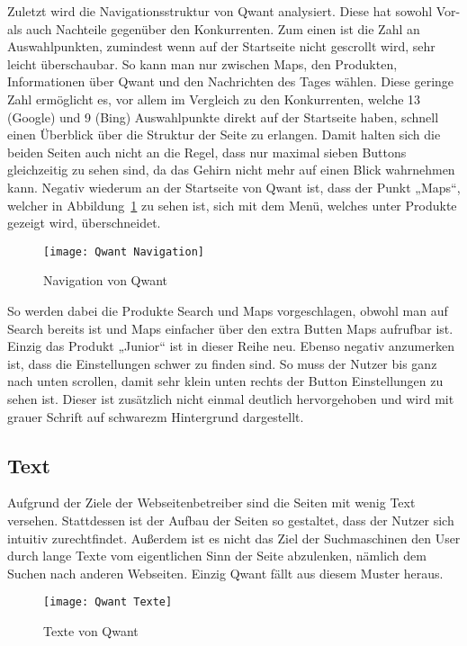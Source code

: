 Zuletzt wird die Navigationsstruktur von Qwant analysiert. Diese hat sowohl Vor- als auch Nachteile gegenüber den Konkurrenten.
Zum einen ist die Zahl an Auswahlpunkten, zumindest wenn auf der Startseite nicht gescrollt wird, sehr leicht überschaubar.
So kann man nur zwischen Maps, den Produkten, Informationen über Qwant und den Nachrichten des Tages wählen. Diese geringe
Zahl ermöglicht es, vor allem im Vergleich zu den Konkurrenten, welche 13 (Google) und 9 (Bing) Auswahlpunkte direkt auf der
Startseite haben, schnell einen Überblick über die Struktur der Seite zu erlangen. Damit halten sich die beiden Seiten auch
nicht an die Regel, dass nur maximal sieben Buttons gleichzeitig zu sehen sind, da das Gehirn nicht mehr auf einen Blick
wahrnehmen kann\autocite[Seite 16]{Maulhardt.20220621b}. Negativ wiederum an der Startseite von Qwant ist, dass der Punkt „Maps“, welcher
in Abbildung~\ref{fig:qwantnavigation} zu sehen ist, sich mit dem Menü, welches unter Produkte gezeigt wird, überschneidet.
\begin{figure}[h]
    \centering
    \texttt{[image: Qwant Navigation]}
    \caption{Navigation von Qwant}
    \label{fig:qwantnavigation}
\end{figure}

So werden dabei die
Produkte Search und Maps vorgeschlagen, obwohl man auf Search bereits ist und Maps einfacher über den extra Butten Maps
aufrufbar ist. Einzig das Produkt „Junior“ ist in dieser Reihe neu. Ebenso negativ anzumerken ist, dass die Einstellungen
schwer zu finden sind. So muss der Nutzer bis ganz nach unten scrollen, damit sehr klein unten rechts der Button Einstellungen
zu sehen ist. Dieser ist zusätzlich nicht einmal deutlich hervorgehoben und wird mit grauer Schrift auf schwarezm Hintergrund dargestellt.

\subsection{Text}
Aufgrund der Ziele der Webseitenbetreiber sind die Seiten mit wenig Text versehen. Stattdessen ist der Aufbau der Seiten
so gestaltet, dass der Nutzer sich intuitiv zurechtfindet. Außerdem ist es nicht das Ziel der Suchmaschinen den User durch
lange Texte vom eigentlichen Sinn der Seite abzulenken, nämlich dem Suchen nach anderen Webseiten. Einzig Qwant fällt aus
diesem Muster heraus.
\begin{figure}[h]
    \centering
    \texttt{[image: Qwant Texte]}
    \caption{Texte von Qwant}
\end{figure}

